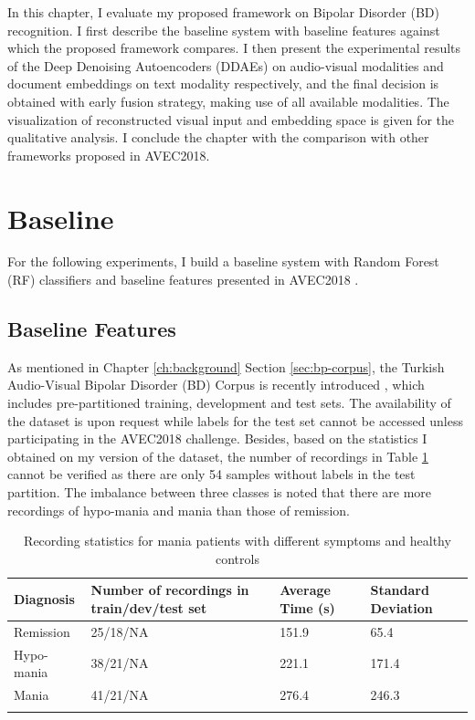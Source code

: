 



In this chapter, I evaluate my proposed framework on Bipolar Disorder (BD) recognition. I first describe the baseline system with baseline features against which the proposed framework compares. I then present the experimental results of the Deep Denoising Autoencoders (DDAEs) on audio-visual modalities and document embeddings on text modality respectively, and the final decision is obtained with early fusion strategy, making use of all available modalities. The visualization of reconstructed visual input and embedding space is given for the qualitative analysis. I conclude the chapter with the comparison with other frameworks proposed in AVEC2018. 




\section{Baseline}

For the following experiments, I build a baseline system with Random Forest (RF) classifiers and baseline features presented in AVEC2018 \cite{ringeval2018}.

\subsection{Baseline Features}

As mentioned in Chapter \ref{ch:background} Section \ref{sec:bp-corpus}, the Turkish Audio-Visual Bipolar Disorder (BD) Corpus is recently introduced \cite{cciftcci2018}, which includes pre-partitioned training, development and test sets. The availability of the dataset is upon request while labels for the test set cannot be accessed unless participating in the AVEC2018 challenge. Besides, based on the statistics I obtained on my version of the dataset, the number of recordings in Table \ref{tab:recording_length} cannot be verified \cite{cciftcci2018} as there are only 54 samples without labels in the test partition. The imbalance between three classes is noted that there are more recordings of hypo-mania and mania than those of remission.


\begin{table}[ht]
    \centering
    \caption{Recording statistics for mania patients with different symptoms and healthy controls}
    \small
    \begin{tabular}{l|p{4cm}|p{2cm}|p{2cm}}
         \Xhline{2\arrayrulewidth}
         Diagnosis & Number of recordings in train/dev/test set & Average Time (s) & Standard Deviation \\
         \hline
         Remission & 25/18/NA & 151.9 & 65.4 \\
         \hline
         Hypo-mania & 38/21/NA & 221.1 & 171.4 \\
         \hline
         Mania & 41/21/NA & 276.4 & 246.3 \\
         \Xhline{2\arrayrulewidth}
    \end{tabular}
    \label{tab:recording_length}
\end{table}


